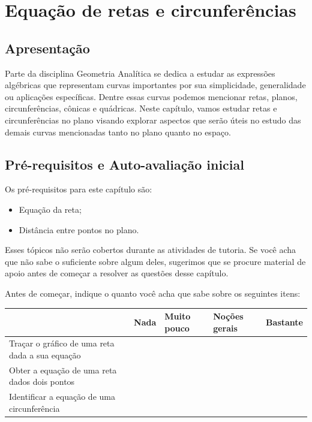 \documentclass[main_estudante.tex]{subfiles}
\begin{document}
\chapter{Equação de retas e circunferências}

\section{Apresentação}

Parte da disciplina Geometria Analítica se dedica a estudar as expressões algébricas que representam curvas importantes por sua simplicidade, generalidade ou aplicações específicas. Dentre essas curvas podemos mencionar retas, planos, circunferências, cônicas e quádricas. Neste capítulo, vamos estudar retas e circunferências no plano visando explorar aspectos que serão úteis no estudo das demais curvas mencionadas tanto no plano quanto no espaço.

\section{Pré-requisitos e Auto-avaliação inicial}

Os pré-requisitos para este capítulo são:
\begin{itemize}
 \item Equação da reta;
 \item Distância entre pontos no plano.
\end{itemize}

Esses tópicos não serão cobertos durante as atividades de tutoria. Se você acha que não sabe o suficiente sobre algum deles, sugerimos que se procure material de apoio antes de começar a resolver as questões desse capítulo.

Antes de começar, indique o quanto você acha que sabe sobre os seguintes itens:

\begin{center}
 \begin{tabular}{|p{35mm}||p{15mm}|p{15mm}|p{15mm}|p{15mm}|} 
 \hline
   & Nada & Muito pouco & Noções gerais & Bastante\\
 \hline
 Traçar o gráfico de uma reta dada a sua equação &  &  &  &  \\ 
 \hline
 Obter a equação de uma reta dados dois pontos &  &  &  &  \\
 \hline
 Identificar a equação de uma circunferência &  &  &  &  \\
 \hline
\end{tabular}
\end{center}
\end{document}
